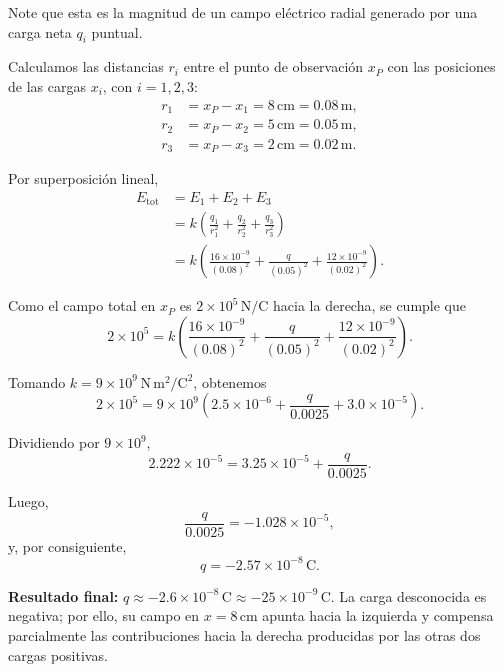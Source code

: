 \documentclass[11pt]{article}
\newcommand{\resultadofinal}[1]{%
  \par\medskip
  \noindent\textbf{Resultado final:} #1\par
}
\begin{document}
Note que esta es la magnitud de un campo eléctrico radial generado por una carga neta $q_i$ puntual.

Calculamos las distancias $r_i$ entre el punto de observación $x_P$ con las posiciones de las cargas $x_i$, con $i=1,2,3$:
\begin{align*}
    r_1&=x_P-x_1=8\,\mathrm{cm}=0.08\,\mathrm{m},\\
    r_2&=x_P-x_2=5\,\mathrm{cm}=0.05\,\mathrm{m},\\
    r_3&=x_P-x_3=2\,\mathrm{cm}=0.02\,\mathrm{m}.
\end{align*}

Por superposición lineal,
\begin{align*}
E_{\mathrm{tot}}
&=E_1+E_2+E_3\\
&=k\left(\frac{q_1}{r_1^2}+\frac{q_2}{r_2^2}+\frac{q_3}{r_3^2}\right)\\
&=k\left(\frac{16\times10^{-9}}{(0.08)^2}+\frac{q}{(0.05)^2}+\frac{12\times10^{-9}}{(0.02)^2}\right).
\end{align*}

Como el campo total en $x_P$ es $2\times 10^5\,\mathrm{N/C}$ hacia la derecha, se cumple que
\begin{equation*}
2\times 10^5
=
k\left(\frac{16\times 10^{-9}}{(0.08)^2}+\frac{q}{(0.05)^2}+\frac{12\times 10^{-9}}{(0.02)^2}\right).
\end{equation*}

Tomando $k=9\times 10^9\,\mathrm{N\,m^2/C^2}$, obtenemos
\begin{equation*}
2\times 10^5
=
9\times 10^9\left(2.5\times 10^{-6}+\frac{q}{0.0025}+3.0\times 10^{-5}\right).
\end{equation*}

Dividiendo por $9\times 10^9$,
\begin{equation*}
2.222\times 10^{-5}=3.25\times 10^{-5}+\frac{q}{0.0025}.
\end{equation*}

Luego,
\begin{equation*}
\frac{q}{0.0025}=-1.028\times 10^{-5},
\end{equation*}
y, por consiguiente,
\begin{equation*}
q=-2.57\times 10^{-8}\,\mathrm{C}.
\end{equation*}

\resultadofinal{$\boxed{q\approx -2.6\times 10^{-8}\,\mathrm{C}\approx -25\times10^{-9}\,\mathrm{C}.}$ La carga desconocida es negativa; por ello, su campo en $x=8\,\mathrm{cm}$ apunta hacia la izquierda y compensa parcialmente las contribuciones hacia la derecha producidas por las otras dos cargas positivas.}
\end{document}
